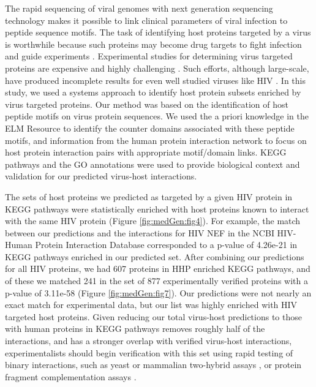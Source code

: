 The rapid sequencing of viral genomes with next generation sequencing
technology \cite{kuntzen07} makes it possible to link clinical
parameters of viral infection to peptide sequence motifs. The task of
identifying host proteins targeted by a virus is worthwhile because
such proteins may become drug targets to fight infection
\cite{brass08} and guide experiments
\cite{jansen2003bayesian,lee2004probabilistic}. Experimental studies
for determining virus targeted proteins are expensive and highly
challenging \cite{kadaveru08}. Such efforts, although large-scale,
have produced incomplete results for even well studied viruses like
HIV \cite{brass08,konig08,zhou08}. In this study, we used a systems
approach to identify host protein subsets enriched by virus targeted
proteins. Our method was based on the identification of host peptide
motifs on virus protein sequences. We used the a priori knowledge in
the ELM Resource to identify the counter domains associated with these
peptide motifs, and information from the human protein interaction
network to focus on host protein interaction pairs with appropriate
motif/domain links. KEGG pathways and the GO annotations were used to
provide biological context and validation for our predicted virus-host
interactions.

The sets of host proteins we predicted as targeted by a given HIV
protein in KEGG pathways were statistically enriched with host
proteins known to interact with the same HIV protein (Figure
\ref{fig:medGen:fig4}). For example, the match between our predictions
and the interactions for HIV NEF in the NCBI HIV-Human Protein
Interaction Database corresponded to a p-value of 4.26e-21 in KEGG
pathways enriched in our predicted set. After combining our
predictions for all HIV proteins, we had 607 proteins in HHP enriched
KEGG pathways, and of these we matched 241 in the set of 877
experimentally verified proteins with a p-value of 3.11e-58 (Figure
\ref{fig:medGen:fig7}). Our predictions were not nearly an exact match
for experimental data, but our list was highly enriched with HIV
targeted host proteins. Given reducing our total virus-host
predictions to those with human proteins in KEGG pathways removes
roughly half of the interactions, and has a stronger overlap with
verified virus-host interactions, experimentalists should begin
verification with this set using rapid testing of binary interactions,
such as yeast or mammalian two-hybrid assays \cite{suzuki2001protein},
or protein fragment complementation assays \cite{remy2002detection}.

